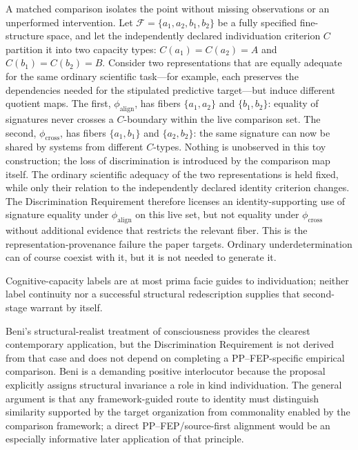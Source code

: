 \documentclass[11pt]{article}
\begin{document}
A matched comparison isolates the point without missing observations or an unperformed intervention. Let \(\mathcal F=\{a_1,a_2,b_1,b_2\}\) be a fully specified fine-structure space, and let the independently declared individuation criterion \(C\) partition it into two capacity types: \(C(a_1)=C(a_2)=A\) and \(C(b_1)=C(b_2)=B\). Consider two representations that are equally adequate for the same ordinary scientific task---for example, each preserves the dependencies needed for the stipulated predictive target---but induce different quotient maps. The first, \(\phi_{\mathrm{align}}\), has fibers \(\{a_1,a_2\}\) and \(\{b_1,b_2\}\): equality of signatures never crosses a \(C\)-boundary within the live comparison set. The second, \(\phi_{\mathrm{cross}}\), has fibers \(\{a_1,b_1\}\) and \(\{a_2,b_2\}\): the same signature can now be shared by systems from different \(C\)-types. Nothing is unobserved in this toy construction; the loss of discrimination is introduced by the comparison map itself. The ordinary scientific adequacy of the two representations is held fixed, while only their relation to the independently declared identity criterion changes. The Discrimination Requirement therefore licenses an identity-supporting use of signature equality under \(\phi_{\mathrm{align}}\) on this live set, but not equality under \(\phi_{\mathrm{cross}}\) without additional evidence that restricts the relevant fiber. This is the representation-provenance failure the paper targets. Ordinary underdetermination can of course coexist with it, but it is not needed to generate it.

Cognitive-capacity labels are at most prima facie guides to individuation; neither label continuity nor a successful structural redescription supplies that second-stage warrant by itself.

Beni's structural-realist treatment of consciousness provides the clearest contemporary application, but the Discrimination Requirement is not derived from that case and does not depend on completing a PP--FEP-specific empirical comparison. Beni is a demanding positive interlocutor because the proposal explicitly assigns structural invariance a role in kind individuation. The general argument is that any framework-guided route to identity must distinguish similarity supported by the target organization from commonality enabled by the comparison framework; a direct PP--FEP/source-first alignment would be an especially informative later application of that principle.
\end{document}
